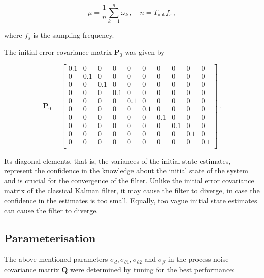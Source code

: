 \begin{equation}
  \mu = \frac{1}{n} \sum_{k=1}^{n}{\omega_k}\,, \quad n = T_{\text{init}} f_s\,,
\end{equation}

\noindent
where $f_s$ is the sampling frequency.

The initial error covariance matrix $\mathbf{P}_{0}$ was given by

\begin{equation}
\mathbf{P}_0 = \begin{bmatrix}
  0.1 & 0 & 0 & 0 & 0 & 0 & 0 & 0 & 0 & 0\\
  0 & 0.1 & 0 & 0 & 0 & 0 & 0 & 0 & 0 & 0\\
  0 & 0 & 0.1 & 0 & 0 & 0 & 0 & 0 & 0 & 0\\
  0 & 0 & 0 & 0.1 & 0 & 0 & 0 & 0 & 0 & 0\\
  0 & 0 & 0 & 0 & 0.1 & 0 & 0 & 0 & 0 & 0\\
  0 & 0 & 0 & 0 & 0 & 0.1 & 0 & 0 & 0 & 0\\
  0 & 0 & 0 & 0 & 0 & 0 & 0.1 & 0 & 0 & 0\\
  0 & 0 & 0 & 0 & 0 & 0 & 0 & 0.1 & 0 & 0\\
  0 & 0 & 0 & 0 & 0 & 0 & 0 & 0 & 0.1 & 0\\
  0 & 0 & 0 & 0 & 0 & 0 & 0 & 0 & 0 & 0.1\\
\end{bmatrix}\,.
\end{equation}

\noindent
Its diagonal elements, that is, the variances of the initial state estimates, represent the confidence in the knowledge about the initial state of the system and is crucial for the convergence of the filter. Unlike the initial error covariance matrix of the classical Kalman filter, it may cause the filter to diverge, in case the confidence in the estimates is too small. Equally, too vague initial state estimates can cause the filter to diverge.

\subsection{Parameterisation}

The above-mentioned parameters $\sigma_d, \sigma_{\theta 1}, \sigma_{\theta 2}$ and $\sigma_{\beta}$ in the process noise covariance matrix $\mathbf{Q}$ were determined by tuning for the best performance:


